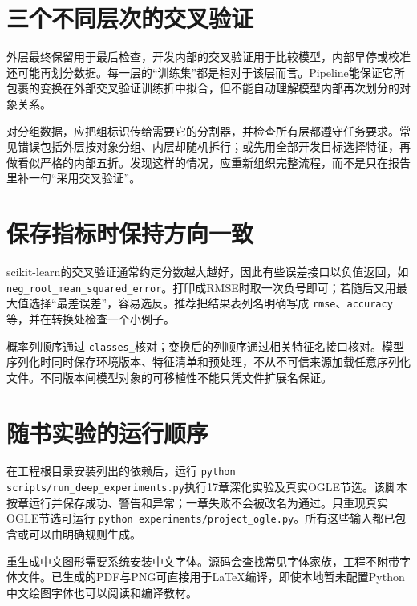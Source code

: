 
\section{三个不同层次的交叉验证}
外层最终保留用于最后检查，开发内部的交叉验证用于比较模型，内部早停或校准还可能再划分数据。每一层的“训练集”都是相对于该层而言。Pipeline能保证它所包裹的变换在外部交叉验证训练折中拟合，但不能自动理解模型内部再次划分的对象关系。

对分组数据，应把组标识传给需要它的分割器，并检查所有层都遵守任务要求。常见错误包括外层按对象分组、内层却随机拆行；或先用全部开发目标选择特征，再做看似严格的内部五折。发现这样的情况，应重新组织完整流程，而不是只在报告里补一句“采用交叉验证”。

\section{保存指标时保持方向一致}
scikit-learn的交叉验证通常约定分数越大越好，因此有些误差接口以负值返回，如 \nolinkurl{neg_root_mean_squared_error}。打印成RMSE时取一次负号即可；若随后又用最大值选择“最差误差”，容易选反。推荐把结果表列名明确写成 \texttt{rmse}、\texttt{accuracy}等，并在转换处检查一个小例子。

概率列顺序通过 \texttt{classes\_}核对；变换后的列顺序通过相关特征名接口核对。模型序列化时同时保存环境版本、特征清单和预处理，不从不可信来源加载任意序列化文件。不同版本间模型对象的可移植性不能只凭文件扩展名保证。

\section{随书实验的运行顺序}
在工程根目录安装列出的依赖后，运行 \texttt{python scripts/run\_deep\_experiments.py}执行17章深化实验及真实OGLE节选。该脚本按章运行并保存成功、警告和异常；一章失败不会被改名为通过。只重现真实OGLE节选可运行 \texttt{python experiments/project\_ogle.py}。所有这些输入都已包含或可以由明确规则生成。

重生成中文图形需要系统安装中文字体。源码会查找常见字体家族，工程不附带字体文件。已生成的PDF与PNG可直接用于LaTeX编译，即使本地暂未配置Python中文绘图字体也可以阅读和编译教材。
